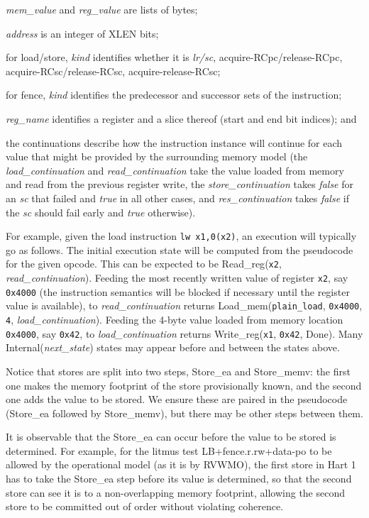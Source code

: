 \begin{tightlist}
\item {\it mem\_value} and {\it reg\_value} are lists of bytes;
\item {\it address} is an integer of XLEN bits;
\item for load/store, {\it kind} identifies whether it is {\em lr/sc}, acquire-RCpc/release-RCpc, acquire-RCsc/release-RCsc, acquire-release-RCsc;
\item for fence, {\it kind} identifies the predecessor and successor sets of the instruction;
\item {\it reg\_name} identifies a register and a slice thereof (start and
  end bit indices); and
\item the continuations describe how the instruction instance will continue for each value that might be provided by the surrounding memory model (the {\it load\_continuation} and {\it read\_continuation} take the value loaded from memory and read from the previous register write, the {\it store\_continuation} takes {\it false} for an {\em sc} that failed and {\it true} in all other cases, and {\it res\_continuation} takes {\it false} if the {\em sc} should fail early and {\it true} otherwise).
\end{tightlist}

\begin{commentary}
For example, given the load instruction \verb!lw x1,0(x2)!,
an execution will typically go as follows.
The initial execution state will be computed from the pseudocode for the given opcode.
This can be expected to be {\sc Read\_reg}({\tt x2}, {\it read\_continuation}).
Feeding the most recently written value of register {\tt x2}, say {\tt 0x4000} (the instruction semantics will be blocked if necessary until the register value is available), to {\it read\_continuation} returns {\sc Load\_mem}({\tt plain\_load}, {\tt 0x4000}, {\tt 4}, {\it load\_continuation}).
Feeding the 4-byte value loaded from memory location {\tt 0x4000}, say {\tt 0x42}, to {\it load\_continuation} returns
{\sc Write\_reg}({\tt x1}, {\tt 0x42}, {\sc Done}).
Many {\sc Internal}({\it next\_state}) states may appear before and between the states above.
\end{commentary}

Notice that stores are split into two steps, {\sc Store\_ea} and {\sc Store\_memv}: the first one makes the memory footprint of the store provisionally known, and the second one adds the value to be stored.
We ensure these are paired in the pseudocode ({\sc Store\_ea} followed by {\sc Store\_memv}), but there may be other steps between them.
\begin{commentary}
It is observable that the {\sc Store\_ea} can occur before the value to be stored is determined.
For example, for the litmus test LB+fence.r.rw+data-po to be allowed by the operational model (as it is by RVWMO), the first store in Hart 1 has to take the {\sc Store\_ea} step before its value is determined, so that the second store can see it is to a non-overlapping memory footprint, allowing the second store to be committed out of order without violating coherence.
\end{commentary}

